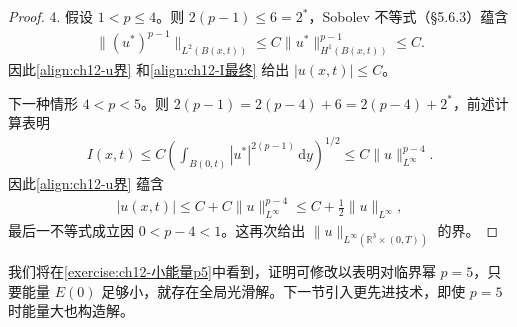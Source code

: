 \documentclass[../../main.tex]{subfiles}
\begin{document}
\begin{proof}
4. 假设 $1<p\leqslant 4$。则 $2(p-1)\leqslant 6=2^*$，Sobolev 不等式（\S5.6.3）蕴含
\begin{align*}
\|(u^*)^{p-1}\|_{L^2(B(x,t))}\leqslant C\|u^*\|_{H^1(B(x,t))}^{p-1}\leqslant C.
\end{align*}
因此\eqref{align:ch12-u界} 和\eqref{align:ch12-I最终} 给出 $|u(x,t)|\leqslant C$。

下一种情形 $4<p<5$。则 $2(p-1)=2(p-4)+6=2(p-4)+2^*$，前述计算表明
\begin{align*}
I(x,t)\leqslant C\left(\int_{B(0,t)}|u^*|^{2(p-1)}\,\mathrm{d}y\right)^{1/2}\leqslant C\|u\|_{L^\infty}^{p-4}.
\end{align*}
因此\eqref{align:ch12-u界} 蕴含
\begin{align*}
|u(x,t)|\leqslant C+C\|u\|_{L^\infty}^{p-4}\leqslant C+\frac{1}{2}\|u\|_{L^\infty},
\end{align*}
最后一不等式成立因 $0<p-4<1$。这再次给出 $\|u\|_{L^\infty(\mathbb{R}^3\times(0,T))}$ 的界。
\end{proof}

我们将在\cref{exercise:ch12-小能量p5}中看到，证明可修改以表明对临界幂 $p=5$，只要能量 $E(0)$ 足够小，就存在全局光滑解。下一节引入更先进技术，即使 $p=5$ 时能量大也构造解。
\end{document}
